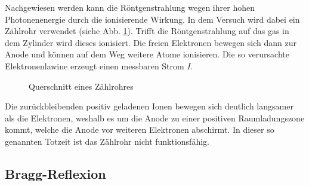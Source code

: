 Nachgewiesen werden kann die Röntgenstrahlung wegen ihrer hohen Photonenenergie durch die ionisierende Wirkung. In dem Versuch wird dabei ein Zählrohr verwendet (siehe Abb. \ref{fig:rohr}). Trifft die Röntgenstrahlung auf das gas in dem Zylinder wird dieses ionisiert. Die freien Elektronen bewegen sich dann zur Anode und können auf dem Weg weitere Atome ionisieren. Die so verursachte Elektronenlawine erzeugt einen messbaren Strom $I$. 

\begin{figure}[h]
  \centering
  \caption{Querschnitt eines Zählrohres}
  \label{fig:rohr}
\end{figure}
Die zurückbleibenden positiv geladenen Ionen bewegen sich deutlich langsamer als die Elektronen, weshalb es um die Anode zu einer positiven Raumladungszone kommt, welche die Anode vor weiteren Elektronen abschirmt. In dieser so genannten Totzeit ist das Zählrohr nicht funktionsfähig.  

\subsection{Bragg-Reflexion}
